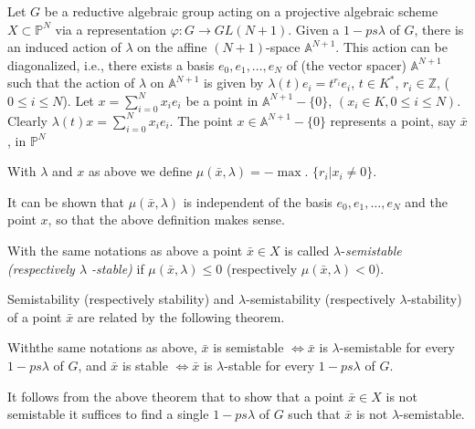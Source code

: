 {\begin{subdefin}
Let $G$ be a reductive algebraic group acting on a projective
algebraic scheme $X \subset \mathbb{P}^N$ via a representation
$\varphi : G \rightarrow GL(N+1) $. Given a $1-ps \lambda$ of $G$,
there is an induced action of $\lambda$ on the affine $(N+1)$-space
$\mathbb{A}^{N+1}$. This action can be diagonalized, i.e., there
exists a basis $e_0,e_1,\ldots,e_N$ of (the vector spacer)
$\mathbb{A}^{N+1}$ such that the action of $\lambda$ on
$\mathbb{A}^{N+1}$ is given by $\lambda(t)e_i = t^{r_i}e_i$, $t
\in K^*$, $r_i \in \mathbb{Z}$, ($0 \le i \le
N$). Let $x = \sum\limits_{i=0}^N x_i e_i$ be a point in
$\mathbb{A}^{N+1} - \{0\}$, $(x_i \in K, 0 \le i \le N)$. 
Clearly $\lambda (t)x = \sum\limits_{i=0}^N x_i e_i$. The point
$x \in \mathbb{A}^{N+1} - \{0\}$ represents a point, say
$\bar{x}$, in $\mathbb{P}^N$ 
\end{subdefin}

\begin{subdefin}\label{chap0:subdef0.0.7}%
With $\lambda$ and $x$ as above we define $\mu (\bar{x}, \lambda) = -
\max$. \break $\{r_i |x_i \neq 0\}$. 

It can be shown that $\mu(\bar{x}, \lambda)$ is independent of the
basis $e_0,e_1,\ldots,e_N$ and the point $x$, so that the above
definition makes sense. 
\end{subdefin}

\begin{subdefin}\label{chap0:subdef0.0.8}%
With the same notations as above a point $\bar{x} \in X$ is
called $\lambda$-{\em{semistable (respectively $\lambda$ -stable)}} if
$\mu(\bar{x}, \lambda) \le 0$ (respectively $\mu(\bar{x},\lambda) <
0$). 

Semistability (respectively stability) and $\lambda$-semistability
(respecti\-vely $\lambda$-stability) of a point $\bar{x}$ are related by
the following theorem. 
\end{subdefin}

\setcounter{subtheorem}{8}
\begin{subtheorem}\label{chap0:subthm0.0.9}%
With\pageoriginale the same notations as above, $\bar{x}$ is semistable
$\Longleftrightarrow \bar{x}$ is $\lambda$-semistable for every
$1-ps\lambda$ of $G$, and $\bar{x}$ is stable $\Longleftrightarrow
\bar{x}$ is $\lambda$-stable for every $1-ps\lambda$ of $G$. 
 
It follows from the above theorem that to show that a point
$\bar{x} \in X$ is not semistable it suffices to find a single
$1-ps\lambda$ of $G$ such that $\bar{x}$ is not $\lambda$-semistable. 


\end{subtheorem}}
